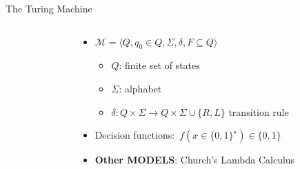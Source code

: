 \documentclass[usenames,dvipsnames]{beamer}
\newcommand{\cM}{\mathcal{M}}
\newcommand\ldiaarg[1]{\langle#1\rangle}
\begin{document}
\begin{frame}{The Turing Machine}
    \begin{columns}
        \begin{column}{0.3\textwidth}
        \end{column}
        \begin{column}{0.7\textwidth}
            \begin{itemize}
                \item $\cM = \ldiaarg{Q,q_0\in Q, \Sigma, \delta, F\subseteq Q}$
                    \begin{itemize}
                        \item $Q$: finite set of states
                        \item $\Sigma$: alphabet
                        \item $\delta:Q\times\Sigma\rightarrow Q\times\Sigma\cup\{R,L\}$ transition rule
                    \end{itemize}
                \item Decision functions:~$f(x\in\{0,1\}^\star)\in\{0,1\}$
                \item \textbf{Other MODELS}: Church's Lambda Calculus

            \end{itemize}
        \end{column}
    \end{columns}
\end{frame}
 
\end{document}
